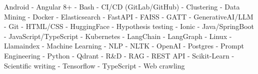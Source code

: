 \small{
Android -
Angular 8+ -
Bash -
CI/CD (GitLab/GitHub) -
Clustering -
Data Mining -
Docker -
Elasticsearch -
FastAPI -
FAISS -
GATT -
GenerativeAI/LLM -
Git -
HTML/CSS -
HuggingFace -
Hypothesis testing -
Ionic -
Java/SpringBoot -
JavaScript/TypeScript -
Kubernetes -
LangChain -
LangGraph -
Linux -
Llamaindex -
Machine Learning -
NLP -
NLTK -
OpenAI -
Postgres -
Prompt Engineering -
Python -
Qdrant -
R\&D -
RAG -
REST API -
Scikit-Learn -
Scientific writing -
Tensorflow -
TypeScript -
Web crawling
}